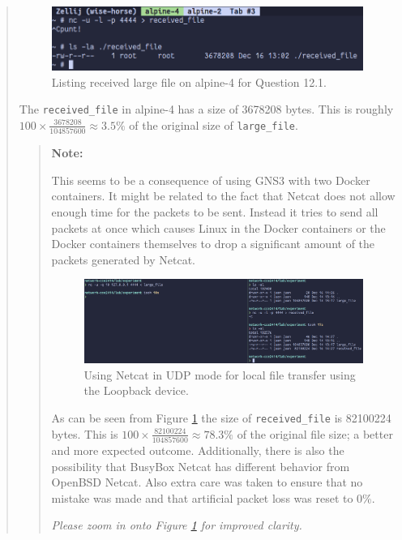 \documentclass{article}
\newenvironment{ans}
{\fbox{Answer}\begin{quote}\nopagebreak}
{\end{quote}}
\newenvironment{note}{%
\begin{quote}
\begin{tcolorbox}[colback=gray!10,arc=0mm,boxrule=0pt]
\raggedright
\textbf{Note:}%
}{%
\end{tcolorbox}
\end{quote}%
}
\begin{document}
\begin{ans}
\begin{figure}[H]
\centering
\includegraphics[width=16cm]{data/q12-received-file.png}
\caption{Listing received large file on alpine-4 for Question 12.1.}
\end{figure}

The \texttt{received\_file} in alpine-4 has a size of
3678208 bytes. This is roughly $100 \times
\frac{3678208}{104857600} \approx 3.5\%$ of the original
size of \texttt{large\_file}.

\begin{note}
This seems to be a consequence of using GNS3 with two Docker
containers.  It might be related to the fact that Netcat does
not allow enough time for the packets to be sent. Instead it
tries to send all packets at once which causes Linux in the
Docker containers or the Docker containers themselves to drop a
significant amount of the packets generated by Netcat.

\begin{figure}[H]
\centering
\includegraphics[width=13cm]{data/local-experiment.png}
\caption{Using Netcat in UDP mode for local file transfer using the Loopback
device.}
\label{fig:experiment}
\end{figure}

As can be seen from Figure \ref{fig:experiment} the size of
\texttt{received\_file} is 82100224 bytes. This is $100
\times \frac{82100224}{104857600} \approx 78.3\%$ of the
original file size; a better and more expected
outcome. Additionally, there is also the possibility that
BusyBox Netcat has different behavior from OpenBSD Netcat.
Also extra care was taken to ensure that no mistake was
made and that artificial packet loss was reset to 0\%.
\vspace{1em}
\begin{center}
\textit{Please zoom in onto Figure \ref{fig:experiment} for improved
clarity.}
\end{center}
\end{note}


\end{ans}
\end{document}

